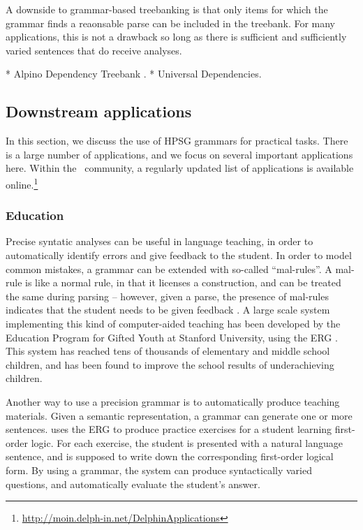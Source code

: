 \documentclass[output=paper,nonflat]{langsci/langscibook}
\begin{document}
A downside to grammar-based treebanking is that only items for which the
grammar finds a reaonsable parse can be included in the treebank. For many
applications, this is not a drawback so long as there is sufficient and sufficiently varied sentences that do receive analyses. 

* Alpino Dependency Treebank \citep{vanderbeek2002alpino}.
* Universal Dependencies.


\subsection{Downstream applications}
\label{cl:downstream}

In this section, we discuss
the use of HPSG grammars for practical tasks.
There is a large number of applications,
and we focus on several important applications here.
Within the \delphin\ community,
a regularly updated list of applications is available online.\footnote{%
	\url{http://moin.delph-in.net/DelphinApplications}
}


\subsubsection{Education}
\label{cl:downstream:edu}

Precise syntatic analyses can be useful in language teaching,
in order to automatically identify errors and give feedback to the student.
In order to model common mistakes,
a grammar can be extended with so-called ``mal-rules''.
A mal-rule is like a normal rule, in that it licenses a construction,
and can be treated the same during parsing
-- however, given a parse,
the presence of mal-rules indicates that the student needs to be given feedback
\citep{Ben:Fli:Oep:04,flickinger2013error,morgadodacosta2016error}.
A large scale system implementing this kind of computer-aided teaching has been developed
by the Education Program for Gifted Youth at Stanford University,
using the ERG \citep{suppes2014teach}.
This system has reached tens of thousands of elementary and middle school children,
and has been found to improve the school results of underachieving children.

Another way to use a precision grammar is to automatically produce teaching materials.
Given a semantic representation,
a grammar can generate one or more sentences.
\citet{Flickinger:17} uses the ERG to produce practice exercises for a student learning first-order logic.
For each exercise, the student is presented with a natural language sentence,
and is supposed to write down the corresponding first-order logical form.
By using a grammar, the system can produce syntactically varied questions,
and automatically evaluate the student's answer.
\end{document}
